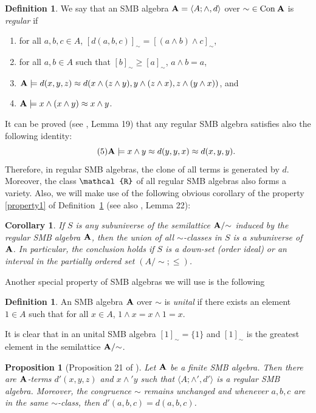 \documentclass[11pt]{amsart}
\newcommand{\m}[1]{{\uppercase {\mathbf {#1}}}}
\newcommand{\vr}[1]{{\uppercase {\mathcal{#1}}}}
\newcommand{\con}{{\rm Con\:}}
\newcommand{\cn}[1]{{\con\m {#1}}}
\newcommand{\lb}{\langle}
\newcommand{\rb}{\rangle}
\newcommand{\mt}{\wedge}
\newtheorem{prp}[thm]{Proposition}
\newtheorem{cor}[thm]{Corollary}
\theoremstyle{definition}
\newtheorem{df}[thm]{Definition}
\begin{document}
\begin{df}\label{regSMBdef}
We say that an SMB algebra $\m a=\lb A;\mt,d\rb$ over ${\sim}\in\cn a$ is {\em regular} if 
\begin{enumerate}
\item\label{property1} for all $a,b,c\in A$, $[d(a,b,c)]_{\sim}=[(a\mt b)\mt c]_{\sim}$,
\item for all $a,b\in A$ such that $[b]_{\sim}\geq[a]_{\sim}$, $a\mt b=a$,
\item $\m a\models d(x,y,z)\approx d(x\mt (z\mt y),y\mt (z\mt x),z\mt (y\mt x))$, and
\item $\m a\models x\mt (x\mt y)\approx x\mt y$.
\end{enumerate}
\end{df}

It can be proved (see \cite{SMB1}, Lemma 19) that any regular SMB algebra satisfies also the following identity:
\[\tag{5}\m a\models x\mt y\approx d(y,y,x)\approx d(x,y,y).\]
Therefore, in regular SMB algebras, the clone of all terms is generated by $d$. Moreover, the class $\vr r$ of all regular SMB algebras also forms a variety. Also, we will make use of the following obvious corollary of the property \eqref{property1} of Definition~\ref{regSMBdef} (see also \cite{SMB1}, Lemma 22): 

\begin{cor}\label{regSMBsubalg}
If $S$ is any subuniverse of the semilattice $\m a/{\sim}$ induced by the regular SMB algebra $\m a$, then the union of all $\sim$-classes in $S$ is a subuniverse of $\m a$. In particular, the conclusion holds if $S$ is a down-set (order ideal) or an interval in the partially ordered set $(A/{\sim};\leq)$.
\end{cor}

Another special property of SMB algebras we will use is the following

\begin{df}\label{unitSMBdef}
An SMB algebra $\m a$ over $\sim$ is {\em unital} if there exists an element $1\in A$ such that for all $x\in A$, $1\mt x=x\mt 1=x$.
\end{df}

It is clear that in an unital SMB algebra $[1]_\sim=\{1\}$ and $[1]_{\sim}$ is the greatest element in the semilattice $\m a/{\sim}$.

\begin{prp}[Proposition 21 of \cite{SMB1}]\label{SMBtospec}
Let $\m a$ be a finite SMB algebra. Then there are $\m a$-terms $d'(x,y,z)$ and $x\mt'y$ such that $\lb A;\mt',d'\rb$ is a regular SMB algebra. Moreover, the congruence ${\sim}$ remains unchanged and whenever $a,b,c$ are in the same ${\sim}$-class, then $d'(a,b,c)=d(a,b,c)$.
\end{prp}
\end{document}
